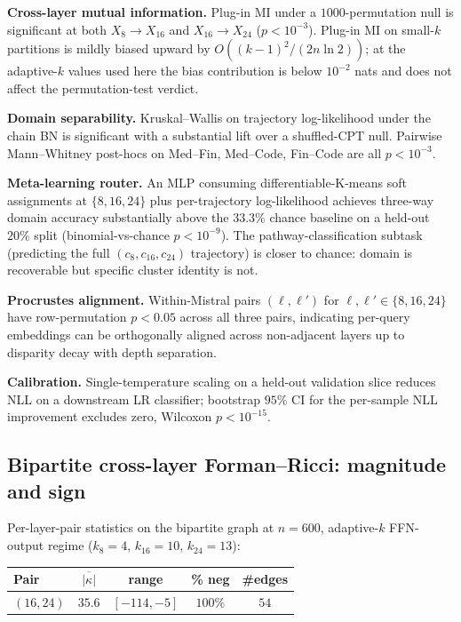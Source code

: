 \documentclass[10pt,twocolumn]{article}
\begin{document}
\textbf{Cross-layer mutual information.} Plug-in MI under a $1000$-permutation null is significant at both $X_8\!\to\!X_{16}$ and $X_{16}\!\to\!X_{24}$ ($p{<}10^{-3}$). Plug-in MI on small-$k$ partitions is mildly biased upward by $O((k{-}1)^2/(2n\ln 2))$; at the adaptive-$k$ values used here the bias contribution is below $10^{-2}$ nats and does not affect the permutation-test verdict.

\textbf{Domain separability.} Kruskal--Wallis on trajectory log-likelihood under the chain BN is significant with a substantial lift over a shuffled-CPT null. Pairwise Mann--Whitney post-hocs on Med--Fin, Med--Code, Fin--Code are all $p{<}10^{-3}$.

\textbf{Meta-learning router.} An MLP consuming differentiable-K-means soft assignments at $\{8,16,24\}$ plus per-trajectory log-likelihood achieves three-way domain accuracy substantially above the $33.3\%$ chance baseline on a held-out $20\%$ split (binomial-vs-chance $p{<}10^{-9}$). The pathway-classification subtask (predicting the full $(c_8,c_{16},c_{24})$ trajectory) is closer to chance: domain is recoverable but specific cluster identity is not.

\textbf{Procrustes alignment.} Within-Mistral pairs $(\ell,\ell')$ for $\ell,\ell'\in\{8,16,24\}$ have row-permutation $p{<}0.05$ across all three pairs, indicating per-query embeddings can be orthogonally aligned across non-adjacent layers up to disparity decay with depth separation.

\textbf{Calibration.} Single-temperature scaling on a held-out validation slice reduces NLL on a downstream LR classifier; bootstrap $95\%$ CI for the per-sample NLL improvement excludes zero, Wilcoxon $p{<}10^{-15}$.

\subsection{Bipartite cross-layer Forman--Ricci: magnitude and sign}
\label{sec:results-forman}

Per-layer-pair statistics on the bipartite graph at $n{=}600$, adaptive-$k$ FFN-output regime ($k_8{=}4$, $k_{16}{=}10$, $k_{24}{=}13$):

\begin{center}\small
\begin{tabular}{lcccc}
\toprule
Pair & $\overline{|\kappa|}$ & range & \% neg & \#edges \\
\midrule
$(16,24)$ & $35.6$ & $[-114, -5]$ & $100\%$ & $54$ \\
\bottomrule
\end{tabular}
\end{center}
\end{document}
